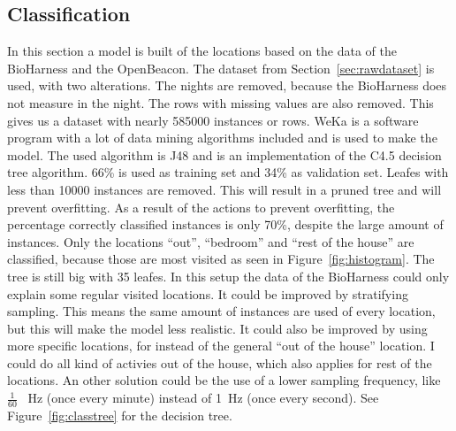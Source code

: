 	\subsection{Classification}
	\label{sec:classification}
	In this section a model is built of the locations based on the data of the BioHarness and the OpenBeacon. The dataset from Section~\ref{sec:rawdataset}  is used, with two alterations. The nights are removed, because the BioHarness does not measure in the night. The rows with missing values are also removed. This gives us a dataset with nearly 585000 instances or rows. WeKa \cite{weka} is a software program with a lot of data mining algorithms included and is used to make the model. The used algorithm is J48 and is an implementation of the C4.5 \cite{quinlan1993c4} decision tree algorithm. 66\% is used as training set and 34\% as validation set. Leafes with less than 10000 instances are removed. This will result in a pruned tree and will prevent overfitting. As a result of the actions to prevent overfitting, the percentage correctly classified instances is only 70\%, despite the large amount of instances. Only the locations ``out'', ``bedroom'' and ``rest of the house'' are classified, because those are most visited as seen in Figure~\ref{fig:histogram}. The tree is still big with 35 leafes. In this setup the data of the BioHarness could only explain some regular visited locations. It could be improved by stratifying sampling. This means the same amount of instances are used of every location, but this will make the model less realistic. It could also be improved by using more specific locations, for instead of the general ``out of the house'' location. I could do all kind of activies out of the house, which also applies for rest of the locations. An other solution could be the use of a lower sampling frequency, like $\frac{1}{60}$ \SI{}{\hertz} (once every minute) instead of \SI{1}{\hertz} (once every second). See Figure~\ref{fig:classtree} for the decision tree. \\
